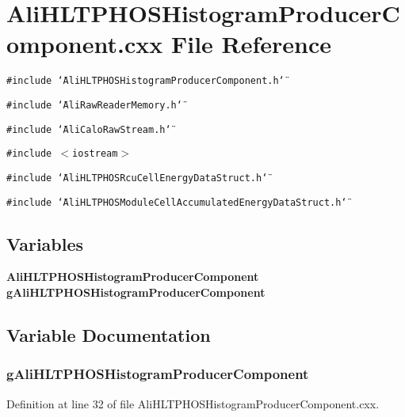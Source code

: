 \section{Ali\-HLTPHOSHistogram\-Producer\-Component.cxx File Reference}
\label{AliHLTPHOSHistogramProducerComponent_8cxx}


{\tt \#include \char`\"{}Ali\-HLTPHOSHistogram\-Producer\-Component.h\char`\"{}}\par
{\tt \#include \char`\"{}Ali\-Raw\-Reader\-Memory.h\char`\"{}}\par
{\tt \#include \char`\"{}Ali\-Calo\-Raw\-Stream.h\char`\"{}}\par
{\tt \#include $<$iostream$>$}\par
{\tt \#include \char`\"{}Ali\-HLTPHOSRcu\-Cell\-Energy\-Data\-Struct.h\char`\"{}}\par
{\tt \#include \char`\"{}Ali\-HLTPHOSModule\-Cell\-Accumulated\-Energy\-Data\-Struct.h\char`\"{}}\par
\subsection*{Variables}
\begin{CompactItemize}
\item 
{\bf Ali\-HLTPHOSHistogram\-Producer\-Component} {\bf g\-Ali\-HLTPHOSHistogram\-Producer\-Component}
\end{CompactItemize}


\subsection{Variable Documentation}
\subsubsection{ {\bf g\-Ali\-HLTPHOSHistogram\-Producer\-Component}}\label{AliHLTPHOSHistogramProducerComponent_8cxx_a0}




Definition at line 32 of file Ali\-HLTPHOSHistogram\-Producer\-Component.cxx.